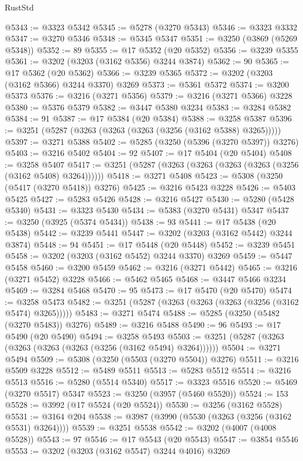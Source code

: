 \begin{lexlean}{RustStd}
\begin{coremodule}
@5343 := @3323 @5342
@5345 := @5278 (@3270 @5343)
@5346 := @3323 @3332
@5347 := @3270 @5346
@5348 := @5345 @5347
@5351 := @3250 (@3869 (@5269 @5348))
@5352 := 89
@5355 := @17 @5352 (@20 @5352)
@5356 := @3239 @5355
@5361 := @3202 (@3203 (@3162 @5356) @3244 @3874)
@5362 := 90
@5365 := @17 @5362 (@20 @5362)
@5366 := @3239 @5365
@5372 := @3202 (@3203 (@3162 @5366) @3244 @3370) @3269
@5373 := @5361 @5372
@5374 := @3200 @5373
@5376 := @3216 (@3271 @5356)
@5379 := @3216 (@3271 @5366) @3228
@5380 := @5376 @5379
@5382 := @3447 @5380 @3234
@5383 := @3284 @5382
@5384 := 91
@5387 := @17 @5384 (@20 @5384)
@5388 := @3258 @5387
@5396 := @3251 (@5287 (@3263 (@3263 (@3263 (@3256 (@3162 @5388) @3265)))))
@5397 := @3271 @5388
@5402 := @5285 (@3250 (@5396 (@3270 @5397)) @3276)
@5403 := @3216 @5402
@5404 := 92
@5407 := @17 @5404 (@20 @5404)
@5408 := @3258 @5407
@5417 := @3251 (@5287 (@3263 (@3263 (@3263 (@3263 (@3256 (@3162 @5408) @3264))))))
@5418 := @3271 @5408
@5423 := @5308 (@3250 (@5417 (@3270 @5418)) @3276)
@5425 := @3216 @5423 @3228
@5426 := @5403 @5425
@5427 := @5283 @5426
@5428 := @3216 @5427
@5430 := @5280 (@5428 @5340)
@5431 := @3323 @5430
@5434 := @5383 (@3270 @5431) @5347
@5437 := @3250 (@3925 (@5374 @5434))
@5438 := 93
@5441 := @17 @5438 (@20 @5438)
@5442 := @3239 @5441
@5447 := @3202 (@3203 (@3162 @5442) @3244 @3874)
@5448 := 94
@5451 := @17 @5448 (@20 @5448)
@5452 := @3239 @5451
@5458 := @3202 (@3203 (@3162 @5452) @3244 @3370) @3269
@5459 := @5447 @5458
@5460 := @3200 @5459
@5462 := @3216 (@3271 @5442)
@5465 := @3216 (@3271 @5452) @3228
@5466 := @5462 @5465
@5468 := @3447 @5466 @3234
@5469 := @3284 @5468
@5470 := 95
@5473 := @17 @5470 (@20 @5470)
@5474 := @3258 @5473
@5482 := @3251 (@5287 (@3263 (@3263 (@3263 (@3256 (@3162 @5474) @3265)))))
@5483 := @3271 @5474
@5488 := @5285 (@3250 (@5482 (@3270 @5483)) @3276)
@5489 := @3216 @5488
@5490 := 96
@5493 := @17 @5490 (@20 @5490)
@5494 := @3258 @5493
@5503 := @3251 (@5287 (@3263 (@3263 (@3263 (@3263 (@3256 (@3162 @5494) @3264))))))
@5504 := @3271 @5494
@5509 := @5308 (@3250 (@5503 (@3270 @5504)) @3276)
@5511 := @3216 @5509 @3228
@5512 := @5489 @5511
@5513 := @5283 @5512
@5514 := @3216 @5513
@5516 := @5280 (@5514 @5340)
@5517 := @3323 @5516
@5520 := @5469 (@3270 @5517) @5347
@5523 := @3250 (@3957 (@5460 @5520))
@5524 := 153
@5528 := @3992 (@17 @5524 (@20 @5524))
@5530 := @3256 (@3162 @5528)
@5531 := @3164 @204
@5538 := @3987 (@3990 (@5530 (@3263 (@3256 (@3162 @5531) @3264))))
@5539 := @3251 @5538
@5542 := @3202 (@4007 (@4008 @5528))
@5543 := 97
@5546 := @17 @5543 (@20 @5543)
@5547 := @3854 @5546
@5553 := @3202 (@3203 (@3162 @5547) @3244 @4016) @3269

\end{coremodule}
\end{lexlean}
